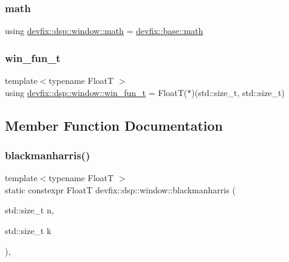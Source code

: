 \subsubsection{\texorpdfstring{math}{math}}
{\footnotesize\ttfamily using \hyperlink{structdevfix_1_1dsp_1_1window_a821ff669dee3e30555dcf32e7643dd0e}{devfix\+::dsp\+::window\+::math} =  \hyperlink{structdevfix_1_1base_1_1math}{devfix\+::base\+::math}}

\mbox{\label{structdevfix_1_1dsp_1_1window_ab2d2c0c5f5fca6dbcf91895115b69eac}} 
\subsubsection{\texorpdfstring{win\+\_\+fun\+\_\+t}{win\_fun\_t}}
{\footnotesize\ttfamily template$<$typename FloatT $>$ \\
using \hyperlink{structdevfix_1_1dsp_1_1window_ab2d2c0c5f5fca6dbcf91895115b69eac}{devfix\+::dsp\+::window\+::win\+\_\+fun\+\_\+t} =  FloatT($\ast$)(std\+::size\+\_\+t, std\+::size\+\_\+t)}



\subsection{Member Function Documentation}
\mbox{\label{structdevfix_1_1dsp_1_1window_ab01ab810661e7cd05d0616e6dd1eeaca}} 
\subsubsection{\texorpdfstring{blackmanharris()}{blackmanharris()}}
{\footnotesize\ttfamily template$<$typename FloatT $>$ \\
static constexpr FloatT devfix\+::dsp\+::window\+::blackmanharris (\begin{DoxyParamCaption}\item[{std\+::size\+\_\+t}]{n,  }\item[{std\+::size\+\_\+t}]{k }\end{DoxyParamCaption})\hspace{0.3cm}{\ttfamily [inline]}, {\ttfamily [static]}}

